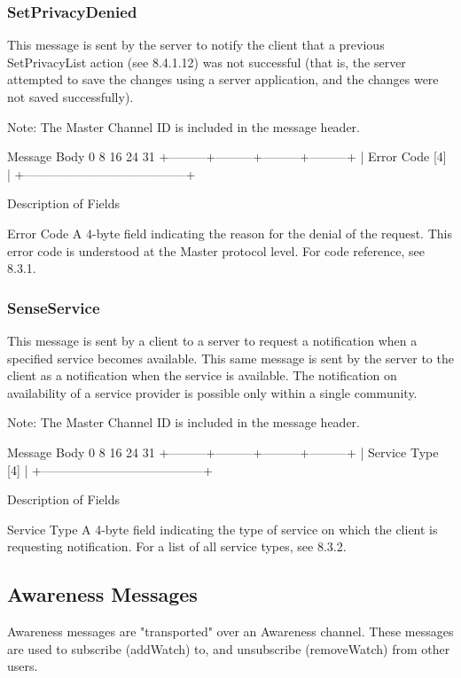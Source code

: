\documentclass[titlepage,oneside]{book}
\begin{document}
\subsubsection{SetPrivacyDenied}

This message is sent by the server to notify the client that a previous
SetPrivacyList action (see 8.4.1.12) was not successful
(that is, the server attempted to save the changes using a server
application, and the changes were not saved successfully).

Note: The Master Channel ID is included in the message header.

Message Body
0         8         16        24      31
+---------+---------+---------+---------+
|             Error Code [4]            |
+---------------------------------------+

Description of Fields

Error Code
  A 4-byte field indicating the reason for the denial of the
  request. This error code is understood at the Master protocol
  level. For code reference, see 8.3.1.

\subsubsection{SenseService}

This message is sent by a client to a server to request a notification
when a specified service becomes available. This same message is sent
by the server to the client as a notification when the service is
available. The notification on availability of a service provider is
possible only within a single community.

Note: The Master Channel ID is included in the message header.

Message Body
0         8         16        24      31
+---------+---------+---------+---------+
|            Service Type  [4]          |
+---------------------------------------+

Description of Fields

Service Type
  A 4-byte field indicating the type of service on which the client is 
  requesting notification. For a list of all service types, see 
  8.3.2.

\subsection{Awareness Messages}

Awareness messages are "transported" over an Awareness channel. These
messages are used to subscribe (addWatch) to, and unsubscribe
(removeWatch) from other users.
\end{document}
